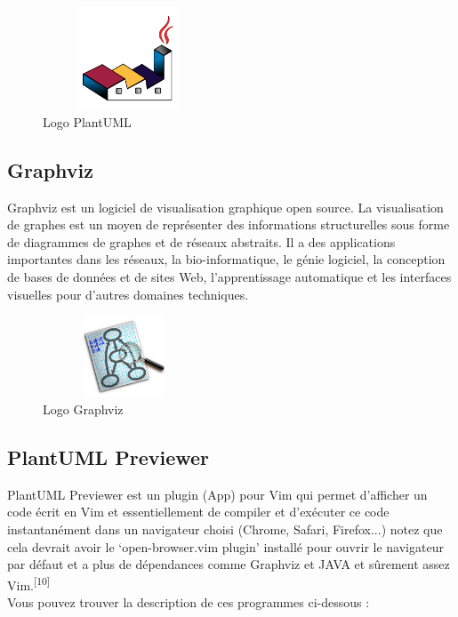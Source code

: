 \documentclass[12pt]{report}
\begin{document}
\vspace{-0.2in}

\begin{figure}[h]
\centering
    \includegraphics[width = 2in, height = 1.2in]{../Images/plantuml.png}
\vspace{-0.1in}
\caption{Logo PlantUML}
\end{figure}

\vspace*{-0.3in}

\subsection{Graphviz}
Graphviz est un logiciel de visualisation graphique open source. La visualisation de graphes est un moyen de représenter des informations structurelles sous forme de diagrammes de graphes et de réseaux abstraits. Il a des applications importantes dans les réseaux, la bio-informatique, le génie logiciel, la conception de bases de données et de sites Web, l'apprentissage automatique et les interfaces visuelles pour d'autres domaines techniques.

\begin{figure}[h]
\centering
    \includegraphics[width = 1.9in, height = 0.95in]{../Images/GraphvizLogo.png}
    \caption{Logo Graphviz}
\end{figure}

\newpage

\subsection{PlantUML Previewer}
PlantUML Previewer est un plugin (App) pour Vim qui permet d'afficher un code écrit en Vim et essentiellement de compiler et d'exécuter ce code instantanément dans un navigateur choisi (Chrome, Safari, Firefox...) notez que cela devrait avoir le `open-browser.vim  plugin' installé pour ouvrir le navigateur par défaut et a plus de dépendances comme Graphviz et JAVA et sûrement assez Vim.\textsuperscript{[10]}
\\
Vous pouvez trouver la description de ces programmes ci-dessous :
\end{document}
